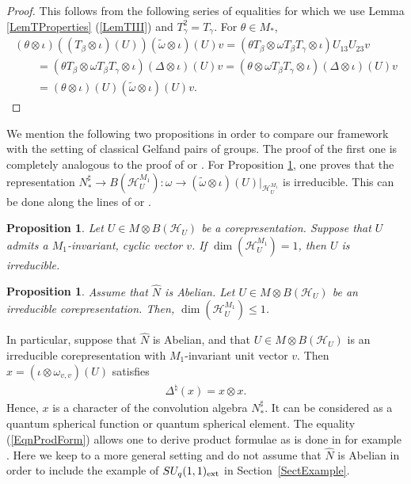 \documentclass[pdftex]{sigma}
\numberwithin{equation}{section}
\newtheorem{prop}[thm]{Proposition}
\theoremstyle{definition}
\newcommand{\cHil}{\mathcal{H}}
\begin{document}
\begin{proof}
 This follows from the following series of equalities for which we use Lemma \ref{LemTProperties} (\ref{LemTIII}) and $T_\gamma^2 = T_\gamma$. For $\theta \in M_\ast$,
 \begin{gather*}
  (\theta \otimes \iota)((T_\beta \otimes \iota)(U))(\tilde{\omega} \otimes \iota)(U)v = (\theta  T_\beta \otimes \omega  T_\beta T_\gamma \otimes \iota) U_{13} U_{23} v  \\
    \qquad{}
=   (\theta  T_\beta \otimes \omega T_\beta T_\gamma \otimes \iota) (\Delta \otimes \iota)(U) v
=
(\theta  \otimes \omega T_\beta T_\gamma \otimes \iota) (\Delta \otimes \iota)(U) v\\
\qquad{}
= (\theta \otimes \iota)(U) (\tilde{\omega} \otimes \iota)(U)v.\tag*{\qed}
 \end{gather*}
 \renewcommand{\qed}{}
\end{proof}



We mention the following two propositions in order to compare our framework with the setting of classical Gelfand pairs of groups. The proof of the f\/irst one is completely analogous to the proof of \cite[Proposition II.6]{Far} or \cite[Lemma 6.2.3]{Dij}. For Proposition \ref{PropAbDim}, one proves that the  representation $N_\ast^\sharp \rightarrow B(\cHil_U^{M_1}): \omega \rightarrow (\tilde{\omega} \otimes \iota)(U)\vert_{\cHil_U^{M_1}}$ is irreducible. This can be done along the lines of \cite[Th\'eor\`eme III.1]{Far} or \cite[Proposition 6.31]{Dij}.

\begin{prop}
 Let $U \in M \otimes B(\cHil_U)$ be a corepresentation. Suppose that $U$ admits a $M_1$-invariant, cyclic vector $v$. If $\dim(\cHil_U^{M_1}) = 1$, then $U$ is irreducible.
\end{prop}


\begin{prop}\label{PropAbDim}
Assume that $\hat{N}$ is Abelian. Let $U \in M \otimes B(\cHil_U)$ be an irreducible   corepresentation. Then, $\dim(\cHil_U^{M_1}) \leq 1$.
\end{prop}


In particular, suppose that  $\hat{N}$ is Abelian, and that $U \in M \otimes B(\cHil_U)$ is an irreducible corepresentation with $M_1$-invariant unit vector $v$. Then $x = (\iota \otimes \omega_{v,v})(U)$ satisf\/ies
\begin{gather}\label{EqnProdForm}
\Delta^\natural(x) = x \otimes x.
\end{gather}
Hence, $x$ is a character of the convolution algebra $N_\ast^\sharp$. It can be considered as a quantum spherical function or quantum spherical element. The equality (\ref{EqnProdForm}) allows one to derive product formulae as is done in for example \cite{VaiE2, VaiGel,VaiHyp}. Here we keep to a more general setting and do not assume that $\hat{N}$ is Abelian in order to include the example of $SU_q(1,1)_{{\rm ext}}$ in Section~\ref{SectExample}.
\end{document}
